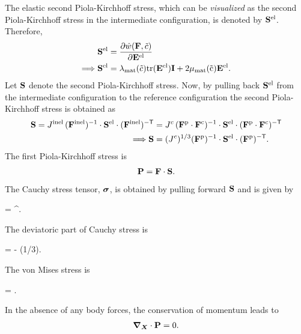 The elastic second Piola-Kirchhoff stress, which can be \textit{visualized} as the second Piola-Kirchhoff stress in the intermediate configuration, is denoted by $\mathbf{S}^{\rm{el}}$. Therefore, 
\begin{align}
    \mathbf{S}^{\rm{el}} &= \frac{\partial \hat{w}(\mathbf{F}, \tilde{c})}{\partial \mathbf{E}^{{\rm{el}}}}\nonumber \\
    \Longrightarrow  \mathbf{S}^{\rm{el}} &= \lambda_{\rm{mat}}(\tilde{c}) \rm{tr}(\mathbf{E}^{\rm{el}})\mathbf{I} + 2 \mu_{\rm{mat}}(\tilde{c}) \mathbf{E}^{\rm{el}}. \label{eq:Sel_tensor}
\end{align}
Let $\mathbf{S}$ denote the second Piola-Kirchhoff stress. Now, by pulling back $\mathbf{S}^{{\rm{el}}}$ from the intermediate configuration to the reference configuration \citep{2010Gurtin} the second Piola-Kirchhoff stress is obtained as
\begin{align}
    \mathbf{S} = J^{{\rm{inel}}} \, (\mathbf{F}^{\rm{inel}})^{-1} \cdot  \mathbf{S}^{\rm{el}} \cdot  (\mathbf{F}^{\rm{inel}})^{{-\sf {T}}} &= {J^c} \, (\mathbf{F}^{{\rm{p}}} \cdot \mathbf{F}^{{\rm{c}}})^{-1} \cdot \mathbf{S}^{{\rm{el}}} \cdot (\mathbf{F}^{\rm{p}} \cdot \mathbf{F}^{\rm{c}})^{{-\sf {T}}}\nonumber\\
    \Longrightarrow \mathbf{S} &= ({J^c})^{1/3} (\mathbf{F}^{\rm{p}})^{-1} \cdot \mathbf{S}^{{\rm{el}}} \cdot  (\mathbf{F}^{\rm{p}})^{{-\sf {T}}}.\label{eq:S_tensor}
\end{align}
The first Piola-Kirchhoff stress is
\begin{gather}
    \mathbf{P} = \mathbf{F} \cdot  \mathbf{S}  \label{eq:P_tensor}.
\end{gather}
The Cauchy stress tensor, $\bm{\sigma}$, is obtained by pulling forward $\mathbf{S}$ and is given by
\begin{nonumbereq}\CS =  \F \cdot  \PKS  \cdot  \F^\T.
\end{nonumbereq} The deviatoric part of Cauchy stress is \begin{nonumbereq}\DCS = \CS - (1/3)\tr{\CS}\I.
\end{nonumbereq}
The von Mises stress is 
\begin{nonumbereq}
    \sigmaeff = . 
\end{nonumbereq}

In the absence of any body forces, the conservation of momentum leads to 
\begin{gather}
\bm{\nabla}_{\bm{X}} \cdot \mathbf{P} = 0.
\end{gather}

